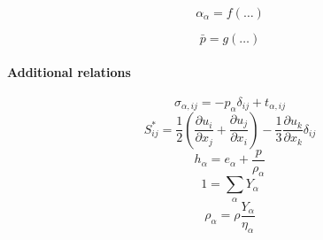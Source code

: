 \documentclass[a4paper,11pt]{article}
\begin{document}
\begin{equation*}
    \alpha_\alpha = f(\dots)
\end{equation*}

\begin{equation*}
    \bar{p} = g(\dots)
\end{equation*}

\paragraph{Additional relations}

\begin{equation*}
    \sigma_{\alpha,ij} = -p_\alpha \delta_{ij} + t_{\alpha,ij}
\end{equation*}
\begin{equation*}
    S^*_{ij} = \frac{1}{2} \left ( \frac{\partial u_i}{\partial x_j} + \frac{\partial u_j}{\partial x_i} \right ) - \frac{1}{3} \frac{\partial u_k}{\partial x_k} \delta_{ij}
\end{equation*}
\begin{equation*}
    h_\alpha = e_\alpha + \frac{p}{\rho_\alpha}
\end{equation*}
\begin{equation*}
    1 = \sum_\alpha Y_\alpha 
\end{equation*}
\begin{equation*}
    \rho_\alpha = \rho \frac{Y_\alpha}{\eta_\alpha}
\end{equation*}
\end{document}
